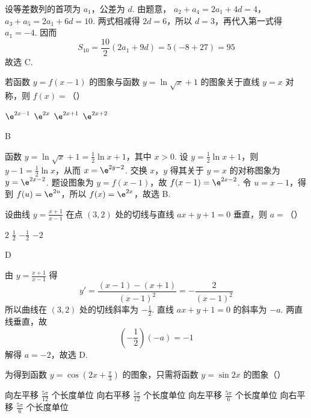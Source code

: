 \begin{solution}
设等差数列的首项为 \(a_1\)，公差为 \(d\). 由题意，
\(a_2+a_4=2a_1+4d=4\)，\(a_3+a_5=2a_1+6d=10\).
两式相减得 \(2d=6\)，所以 \(d=3\)，再代入第一式得 \(a_1=-4\). 因而
\[
S_{10}=\frac{10}{2}\left(2a_1+9d\right)=5(-8+27)=95
\]
故选 C.
\end{solution}

\begin{problem}
若函数 \( y = f(x - 1) \) 的图象与函数 \( y = \ln \sqrt{x} + 1 \) 的图象关于直线 \( y = x \) 对称，则 \( f(x) = \)（\quad）

\choices
    {\(\e^{2x - 1}\)}
    {\(\e^{2x}\)}
    {\(\e^{2x + 1}\)}
    {\(\e^{2x + 2}\)}
\end{problem}

\begin{answer}
B
\end{answer}

\begin{solution}
函数 \(y=\ln\sqrt{x}+1=\frac{1}{2}\ln x+1\)，其中 \(x>0\). 设 \(y=\frac{1}{2}\ln x+1\)，则 \(y-1=\frac{1}{2}\ln x\)，从而 \(x=\e^{2y-2}\). 交换 \(x\)，\(y\) 得其关于 \(y=x\) 的对称图象为 \(y=\e^{2x-2}\). 题设图象为 \(y=f(x-1)\)，故 \(f(x-1)=\e^{2x-2}\). 令 \(u=x-1\)，得到 \(f(u)=\e^{2u}\)，所以 \(f(x)=\e^{2x}\)，故选 B.
\end{solution}

\begin{problem}
设曲线 \( y = \frac{x + 1}{x - 1} \) 在点 \((3, 2)\) 处的切线与直线 \( ax + y + 1 = 0 \) 垂直，则 \( a = \)（\quad）

\choices
    {\(2\)}
    {\(\frac{1}{2}\)}
    {\(-\frac{1}{2}\)}
    {\(-2\)}
\end{problem}

\begin{answer}
D
\end{answer}

\begin{solution}
由 \(y=\frac{x+1}{x-1}\) 得
\[
y'=\frac{(x-1)-(x+1)}{(x-1)^2}=-\frac{2}{(x-1)^2}
\]
所以曲线在 \((3,2)\) 处的切线斜率为 \(-\frac{1}{2}\). 直线 \(ax+y+1=0\) 的斜率为 \(-a\). 两直线垂直，故
\[
\left(-\frac{1}{2}\right)(-a)=-1
\]
解得 \(a=-2\)，故选 D.
\end{solution}

\begin{problem}
为得到函数 \( y = \cos \left(2x + \frac{\pi}{3}\right) \) 的图象，只需将函数 \( y = \sin 2x \) 的图象（\quad）

\choices
    {向左平移 \(\frac{5\pi}{12}\) 个长度单位}
    {向右平移 \(\frac{5\pi}{12}\) 个长度单位}
    {向左平移 \(\frac{5\pi}{6}\) 个长度单位}
    {向右平移 \(\frac{5\pi}{6}\) 个长度单位}
\end{problem}

